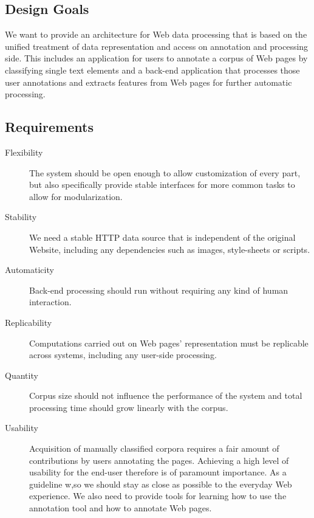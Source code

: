 \subsection{Design Goals}

We want to provide an architecture for Web data processing that is based on the unified treatment of data representation and access on annotation and processing side.
This includes an application for users to annotate a corpus of Web pages by classifying single text elements and
a back-end application that processes those user annotations and extracts features from Web pages for further automatic processing. 

\subsection{Requirements}

\begin{description}

\item[Flexibility]
The system should be open enough to allow customization of every part, but also specifically provide stable interfaces for more common tasks to allow for modularization.

\item[Stability]
We need a stable HTTP data source that is independent of the original Website, including any dependencies such as images, style-sheets or scripts.

\item[Automaticity]
Back-end processing should run without requiring any kind of human interaction.

\item[Replicability]
Computations carried out on Web pages' representation must be replicable across systems, including any user-side processing.

\item[Quantity]
Corpus size should not influence the performance of the system and total processing time should grow linearly with the corpus.

\item[Usability]
Acquisition of manually classified corpora requires a fair amount of contributions by users annotating the pages.
Achieving a high level of usability for the end-user therefore is of paramount importance.
As a guideline w,so we should stay as close as possible to the everyday Web experience.
We also need to provide tools for learning how to use the annotation tool and how to annotate Web pages.

\end{description}

